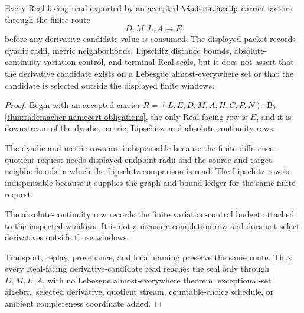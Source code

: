 \begin{theorem}
\label{thm:rademacher-finite-derivative-candidate-packet}
Every Real-facing read exported by an accepted $\RademacherUp$ carrier factors through the finite route
$$
D,M,L,A \longmapsto E
$$
before any derivative-candidate value is consumed. The displayed packet records dyadic radii, metric neighborhoods, Lipschitz distance bounds, absolute-continuity variation control, and terminal Real seals, but it does not assert that the derivative candidate exists on a Lebesgue almost-everywhere set or that the candidate is selected outside the displayed finite windows.
\end{theorem}
\begin{proof}
Begin with an accepted carrier $R=(L,E,D,M,A,H,C,P,N)$. By \autoref{thm:rademacher-namecert-obligations}, the only Real-facing row is $E$, and it is downstream of the dyadic, metric, Lipschitz, and absolute-continuity rows.

The dyadic and metric rows are indispensable because the finite difference-quotient request needs displayed endpoint radii and the source and target neighborhoods in which the Lipschitz comparison is read. The Lipschitz row is indispensable because it supplies the graph and bound ledger for the same finite request.

The absolute-continuity row records the finite variation-control budget attached to the inspected windows. It is not a measure-completion row and does not select derivatives outside those windows.

Transport, replay, provenance, and local naming preserve the same route. Thus every Real-facing derivative-candidate read reaches the seal only through $D,M,L,A$, with no Lebesgue almost-everywhere theorem, exceptional-set algebra, selected derivative, quotient stream, countable-choice schedule, or ambient completeness coordinate added.
\end{proof}

